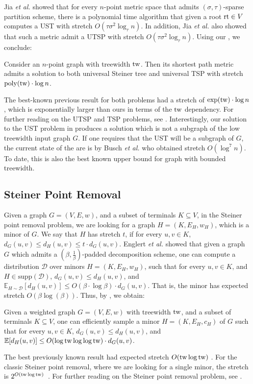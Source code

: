 \documentclass{theoretics}
\newcommand{\tw}{{\rm tw}}
\newcommand{\poly}{\mathrm{poly}}
\newcommand{\supp}{\mathrm{supp}}
\newcommand{\etal}{{\em et al. \xspace}}
\newcommand{\UST}{\textsf{UST}\xspace}
\newcommand{\UTSP}{\textsf{UTSP}\xspace}
\newcommand{\TSP}{\textsf{TSP}\xspace}
\newcommand{\rt}{\mbox{\rm rt}}
\newcommand{\calD}{\mathcal{D}}
\newcommand{\E}{{\mathbb{E}}}
\begin{document}
Jia \etal \cite{JLNRS05} showed that for every $n$-point metric space that admits $(\sigma,\tau)$-sparse partition scheme, there is a polynomial time algorithm that given a root $\rt\in V$ computes a  \UST with stretch $O(\tau\sigma^2\log_\tau n)$.
In addition, Jia \etal \cite{JLNRS05} also showed that such a metric admit a \UTSP with stretch  $O(\tau\sigma^2\log_\tau n)$.
Using our , we conclude:
\begin{corollary}\label{cor:UST}
	Consider an $n$-point graph with treewidth $\tw$. Then its shortest path metric admits a solution to both universal Steiner tree and universal TSP with stretch $\poly(\tw)\cdot\log n$. 
\end{corollary}
The best-known previous result for both problems had a stretch of $\exp(\tw)\cdot\log n$ \cite{Fil20}, which is exponentially larger than ours in terms of the $\tw$ dependency. For further reading on the \UTSP and \TSP problems, see \cite{platzman1989spacefilling,bertsimas1989worst,JLNRS05,GHR06,HKL06,schalekamp2008algorithms,gorodezky2010improved,bhalgat2011optimal,BDRRS12,BLT14,Fil20, Filtser24}. Interestingly, our solution to the \UST problem in  produces a solution which is not a subgraph of the low treewidth input graph $G$. If one requires that the \UST will be a subgraph of $G$, the current state of the are is by Busch \etal \cite{BCFHHR23} who obtained stretch $O(\log^7 n)$. To date, this is also the best known upper bound for graph with bounded treewidth.



\subsection{Steiner Point Removal}
Given a graph $G=(V,E,w)$, and a subset of terminals $K\subseteq V$, in the Steiner point removal problem, we are looking for a graph $H=(K,E_H,w_H)$, which is a minor of $G$. We say that $H$ has stretch $t$, if for every $u,v\in K$, $d_G(u,v)\le d_H(u,v)\le t\cdot d_G(u,v)$. 
Englert \etal \cite{EGKRTT14} showed that given a graph $G$ which admits a $(\beta,\frac1\beta)$-padded decomposition scheme, one can compute a distribution $\calD$ over minors $H=(K,E_H,w_H)$, such that for every $u,v\in K$, and $H\in\supp(\calD)$, $d_G(u,v)\le d_H(u,v)$, and $\E_{H\sim\calD}[d_H(u,v)]\le O(\beta\cdot\log\beta)\cdot d_G(u,v)$. That is, the minor has expected stretch $O(\beta \log(\beta))$. Thus, by , we obtain:

\begin{corollary}\label{cor:SPR}
	Given a weighted graph $G=(V,E,w)$ with treewidth $\tw$, and a subset of terminals $K\subseteq V$, one can efficiently sample a minor $H=(K,E_H,c_H)$ of $G$ such that for every $u,v\in K$, $d_G(u,v)\le d_H(u,v)$, and $\E[d_H(u,v)]\le O(\log\tw\log\log\tw)\cdot d_G(u,v)$.
\end{corollary}
The best previously known result had expected stretch $O(\tw\log\tw)$ \cite{EGKRTT14,AGGNT19}. 
For the classic Steiner point removal, where we are looking for a single minor, the stretch is $2^{O(\tw\log\tw)}$~\cite{CCLMST23}. For further reading on the Steiner point removal problem, see \cite{G01,CXKR06,KKN15,Che18,Fil19,FKT19,Fil20,HL22,CCLMST23}.
\end{document}
